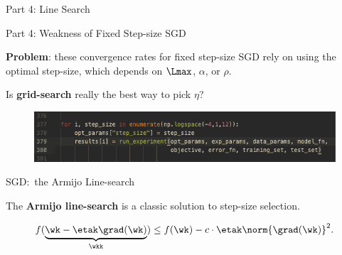 \documentclass[mathserif,notheorems, hyperref={colorlinks, citecolor=blue, urlcolor=blue, linkcolor=blue}]{beamer}
\def\\{}%
\begin{document}

    \begin{frame}
       \begin{center}
          \huge Part 4: Line Search\\
       \end{center} 
    \end{frame}

   
    \begin{frame}{Part 4: Weakness of Fixed Step-size SGD}
       \begin{center}
           \Large
           \textbf{Problem}: these convergence rates for fixed step-size SGD rely on using the optimal step-size, which depends on \( \Lmax \), \( \alpha \), or \( \rho \). \\

            \vspace{3ex}
            Is \textbf{grid-search} really the best way to pick \( \eta \)?
       \end{center} 
      
    \begin{figure}[]
        \centering
        \includegraphics[width=\linewidth]{figures/grid_search}
    \end{figure}

    \end{frame}

    \begin{frame}{SGD:\ the Armijo Line-search}
       
        The \textbf{Armijo line-search} is a classic solution to step-size selection.

        \[ f(\underbrace{\wk - \etak \grad(\wk)}_{\wkk}) \leq f(\wk) - c\cdot \etak \norm{\grad(\wk)}^2. \]
        \vspace{1.2ex}

        \begin{figure}[]
            \centering
            
        \end{figure} 
    \end{frame}
\end{document}

